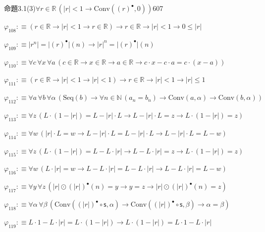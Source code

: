 \begin{fullproof}{命題3.1(3)}{$\forall r \in \mathbb{R}\,(\lvert r \rvert < 1 \to \mathrm{Conv}({(r)^{\bullet}},0))$}{607}
\begin{abbrevlist}
\item $\varphi_{108} :\equiv (r \in \mathbb{R} \to \lvert r \rvert < 1 \to r \in \mathbb{R}) \to r \in \mathbb{R} \to \lvert r \rvert < 1 \to 0 \leq \lvert r \rvert$
\item $\varphi_{109} :\equiv \lvert {{r}^{n}} \rvert = \lvert {(r)^{\bullet}} \rvert(n) \to {{\lvert r \rvert}^{n}} = \lvert {(r)^{\bullet}} \rvert(n)$
\item $\varphi_{110} :\equiv \forall c\,\forall x\,\forall a\,(c \in \mathbb{R} \to x \in \mathbb{R} \to a \in \mathbb{R} \to c \cdot x - c \cdot a = c \cdot (x - a))$
\item $\varphi_{111} :\equiv (r \in \mathbb{R} \to \lvert r \rvert < 1 \to \lvert r \rvert < 1) \to r \in \mathbb{R} \to \lvert r \rvert < 1 \to \lvert r \rvert \leq 1$
\item $\varphi_{112} :\equiv \forall a\,\forall b\,\forall \alpha\,(\mathrm{Seq}(b) \to \forall n \in \mathbb{N}\,(a_{n} = b_{n}) \to \mathrm{Conv}(a,\alpha) \to \mathrm{Conv}(b,\alpha))$
\item $\varphi_{113} :\equiv \forall z\,(L \cdot (1 - \lvert r \rvert) = L - \lvert r \rvert \cdot L \to L - \lvert r \rvert \cdot L = z \to L \cdot (1 - \lvert r \rvert) = z)$
\item $\varphi_{114} :\equiv \forall w\,(\lvert r \rvert \cdot L = w \to L - \lvert r \rvert \cdot L = L - \lvert r \rvert \cdot L \to L - \lvert r \rvert \cdot L = L - w)$
\item $\varphi_{115} :\equiv \forall z\,(L \cdot (1 - \lvert r \rvert) = L - L \cdot \lvert r \rvert \to L - L \cdot \lvert r \rvert = z \to L \cdot (1 - \lvert r \rvert) = z)$
\item $\varphi_{116} :\equiv \forall w\,(L \cdot \lvert r \rvert = w \to L - L \cdot \lvert r \rvert = L - L \cdot \lvert r \rvert \to L - L \cdot \lvert r \rvert = L - w)$
\item $\varphi_{117} :\equiv \forall y\,\forall z\,(\lvert r \rvert \odot {(\lvert r \rvert)^{\bullet}}(n) = y \to y = z \to \lvert r \rvert \odot {(\lvert r \rvert)^{\bullet}}(n) = z)$
\item $\varphi_{118} :\equiv \forall \alpha\,\forall \beta\,(\mathrm{Conv}({(\lvert r \rvert)^{\bullet}} \circ \mathsf{s},\alpha) \to \mathrm{Conv}({(\lvert r \rvert)^{\bullet}} \circ \mathsf{s},\beta) \to \alpha = \beta)$
\item $\varphi_{119} :\equiv L \cdot 1 - L \cdot \lvert r \rvert = L \cdot (1 - \lvert r \rvert) \to L \cdot (1 - \lvert r \rvert) = L \cdot 1 - L \cdot \lvert r \rvert$

\end{abbrevlist}
\end{fullproof}
